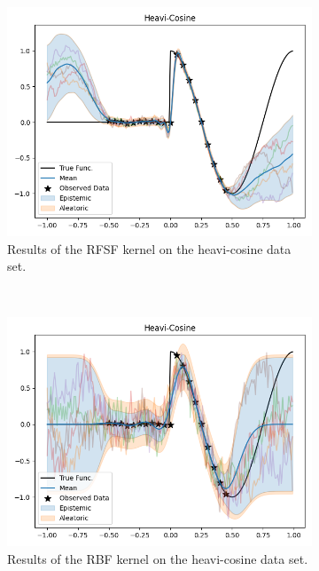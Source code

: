 \begin{figure}
\begin{subfigure}{0.49\linewidth}
        \centering
        \includegraphics[width=\linewidth, height=0.618033988749895\linewidth]{graphics/generated/gp-heavicosine-rfsf.png}  %
        \caption{Results of the \acs{RFSF} kernel on the heavi-cosine data set.}
    \end{subfigure}
	~
    \begin{subfigure}{0.49\linewidth}
        \centering
        \includegraphics[width=\linewidth, height=0.618033988749895\linewidth]{graphics/generated/gp-heavicosine-rbf.png}  %
        \caption{Results of the \acs{RBF} kernel on the heavi-cosine data set.}
    \end{subfigure}
    \\[0.5cm]
    \begin{subfigure}{0.49\linewidth}
        \centering

\end{subfigure}
\end{figure}
